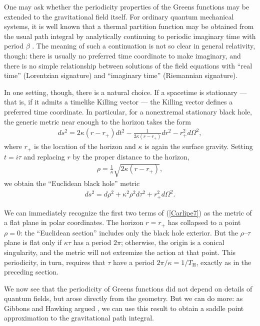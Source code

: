 \documentclass[12pt]{article}
\begin{document}
One may ask whether the periodicity properties of the Greens
functions may be extended to the gravitational field itself.
For ordinary quantum mechanical systems, it is well known that 
a thermal partition function may be obtained from the
usual path integral by analytically continuing to periodic
imaginary time with period $\beta$ \cite{Feynman}.  The meaning
of such a continuation is not so clear in general
relativity, though: there is usually no preferred time coordinate to 
make imaginary, and there is no simple relationship between
solutions of the field equations with ``real time'' (Lorentzian
signature) and ``imaginary time'' (Riemannian signature).  

In one setting, though, there is a natural choice.  If a spacetime 
is stationary --- that is, if it admits a timelike Killing vector --- 
the Killing vector defines a preferred time coordinate.  In particular, 
for a nonextremal stationary black hole, the generic metric near 
enough to the horizon takes the form
\begin{align*}
ds^2 = 2\kappa(r-r_+)dt^2 - \frac{1}{2\kappa(r-r_+)}dr^2 
  - r_+^2d\Omega^2   ,
\end{align*}
where $r_+$ is the location of the horizon and $\kappa$ is again 
the surface gravity.  Setting $t=i\tau$ and replacing $r$ by the 
proper distance to the horizon,
\begin{align*}
\rho = \frac{1}{\kappa}\sqrt{2\kappa(r-r_+)}  ,
\end{align*}
we obtain the ``Euclidean black hole'' metric
\begin{align}
ds^2 = d\rho^2 + \kappa^2\rho^2d\tau^2  + r_+^2d\Omega^2 .
\label{Carlipe7}
\end{align}

We can immediately recognize the first two terms of (\ref{Carlipe7})
as the metric of a flat plane in polar coordinates.  The 
horizon $r=r_+$ has collapsed to a point $\rho=0$: the 
``Euclidean section'' includes only the black hole exterior.  
But the $\rho$--$\tau$ plane is flat only if $\kappa\tau$ has a 
period $2\pi$; otherwise, the origin is a conical singularity, and the 
metric will not extremize the action at that point.  This periodicity, 
in turn, requires that $\tau$ have a period 
$2\pi/\kappa = 1/T_{\scriptscriptstyle\mathrm{H}}$,
exactly as in the preceding section.

We now see that the periodicity of Greens functions did not depend 
on details of quantum fields, but arose directly from the geometry.  But 
we can do more: as Gibbons and Hawking argued \cite{GibHawk}, 
we can use this result to obtain a saddle point approximation to the 
gravitational path integral.
\end{document}
